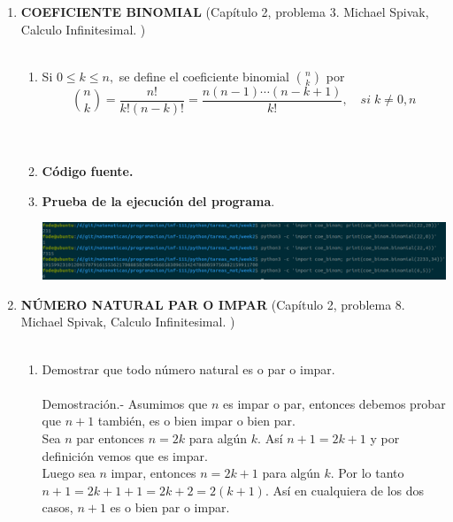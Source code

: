 
\begin{enumerate}

\item \textbf{COEFICIENTE BINOMIAL} (Capítulo 2, problema 3. Michael Spivak, Calculo Infinitesimal. )\\\\

    \begin{enumerate}[\bfseries a)]

	\item Si $0\leq k \leq n,$ se define el coeficiente binomial $\displaystyle \binom{n}{k}$ por
	    $$\binom{n}{k} = \dfrac{n!}{k!(n-k)!} = \dfrac{n(n-1) \cdots (n-k+1)}{k!}, \quad si \; k\neq 0, n$$\\\\

	\item \textbf{Código fuente.}\\ 
	    
	    
	    \vspace{3cm}
	
	\item \textbf{Prueba de la ejecución del programa}.\\
	    \begin{center}
		\includegraphics[scale=.35]{imagenes/tareas_mat/week2/coe_binom.png}
	    \end{center}

    \end{enumerate}

\newpage


\item \textbf{NÚMERO NATURAL PAR O IMPAR} (Capítulo 2, problema 8. Michael Spivak, Calculo Infinitesimal. )\\\\

    \begin{enumerate}[\bfseries a)]

	\item Demostrar que todo número natural es o par o impar.\\\\
	    Demostración.- \; Asumimos que $n$ es impar o par, entonces debemos probar que $n+1$ también, es o bien impar o bien par.\\ 
	    Sea $n$ par entonces $n=2k$ para algún $k$. Así $n+1=2k+1$  y por definición vemos que es impar.\\
	    Luego sea $n$ impar, entonces $n=2k+1$ para algún $k$.  Por lo tanto $n+1=2k+1+1 = 2k +2 = 2(k+1)$. Así en cualquiera de los dos casos, $n+1$ es o bien par o impar. \\\\  


\end{enumerate}
\end{enumerate}
